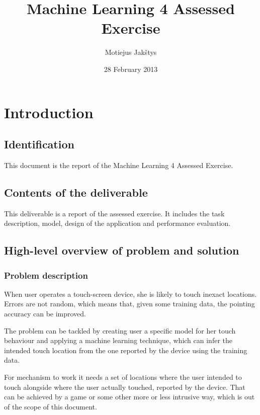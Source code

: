 \documentclass[english,11pt]{article}
\numberwithin{equation}{section}
\begin{document}
\title{Machine Learning 4 Assessed Exercise}
\author{Motiejus Jakštys}
\date{28 February 2013}

\maketitle
\pagebreak
\tableofcontents
\pagebreak

\section{Introduction}
\subsection{Identification}
This document is the report of the Machine Learning 4 Assessed Exercise.

\subsection{Contents of the deliverable}

This deliverable is a report of the assessed exercise. It includes the task
description, model, design of the application and performance evaluation.

\subsection{High-level overview of problem and solution}

\subsubsection{Problem description}

When user operates a touch-screen device, she is likely to touch inexact
locations\cite{WeiRogMur}. Errors are not random, which means that, given some
training data, the pointing accuracy can be improved.

The problem can be tackled by creating user a specific model for her touch
behaviour and applying a machine learning technique, which can infer the
intended touch location from the one reported by the device using the training
data.

For mechanism to work it needs a set of locations where the user intended to
touch alongside where the user actually touched, reported by the device. That
can be achieved by a game or some other more or less intrusive way, which is out
of the scope of this document.
\end{document}
